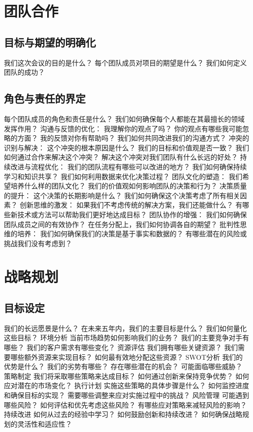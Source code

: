 \documentclass[12pt]{book}
\begin{document}
\section{团队合作}
\subsection{目标与期望的明确化}
我们这次会议的目的是什么？
每个团队成员对项目的期望是什么？
我们如何定义团队的成功？

\subsection{角色与责任的界定}
每个团队成员的角色和责任是什么？
我们如何确保每个人都能在其最擅长的领域发挥作用？
沟通与反馈的优化：
我理解你的观点了吗？
你的观点有哪些我可能忽略的方面？
我的反馈对你有帮助吗？
我们如何共同改进我们的沟通方式？
冲突的识别与解决：
这个冲突的根本原因是什么？
我们的目标和价值观是否一致？
我们如何通过合作来解决这个冲突？
解决这个冲突对我们团队有什么长远的好处？
持续改进与流程优化：
我们的团队流程有哪些可以改进的地方？
我们如何确保持续学习和知识共享？
我们如何利用数据来优化决策过程？
团队文化的塑造：
我们希望培养什么样的团队文化？
我们的价值观如何影响团队的决策和行为？
决策质量的提升：
这个决策的长期影响是什么？
我们如何确保这个决策考虑了所有相关因素？
创新思维的激发：
如果我们不考虑传统的解决方案，我们还能做什么？
有哪些新技术或方法可以帮助我们更好地达成目标？
团队协作的增强：
我们如何确保团队成员之间的有效协作？
在任务分配上，我们如何协调各自的期望？
批判性思维的培养：
我们如何确保我们的决策是基于事实和数据的？
有哪些潜在的风险或挑战我们没有考虑到？


\section{战略规划}
\subsection{目标设定}
我们的长远愿景是什么？
在未来五年内，我们的主要目标是什么？
我们如何量化这些目标？
环境分析
当前市场趋势如何影响我们的业务？
我们的主要竞争对手有哪些？
我们的客户需求有哪些变化？
资源评估
我们拥有哪些关键资源？
我们需要哪些额外资源来实现目标？
如何最有效地分配这些资源？
SWOT分析
我们的优势是什么？
我们的劣势有哪些？
存在哪些潜在的机会？
可能面临哪些威胁？
策略制定
我们将采取哪些策略来达成目标？
如何通过创新来保持竞争优势？
如何应对潜在的市场变化？
执行计划
实施这些策略的具体步骤是什么？
如何监控进度和确保目标的实现？
需要哪些调整来应对实施过程中的挑战？
风险管理
可能遇到哪些风险？
如何评估和优先考虑这些风险？
有哪些应对策略来减轻风险的影响？
持续改进
如何从过去的经验中学习？
如何鼓励创新和持续改进？
如何确保战略规划的灵活性和适应性？
\end{document}
